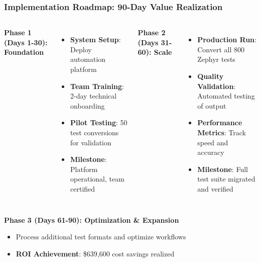 \begin{frame}
\frametitle{Implementation Roadmap: 90-Day Value Realization}
\begin{columns}
\textbf{Phase 1 (Days 1-30): Foundation}
\begin{itemize}
    \item \textbf{System Setup}: Deploy automation platform
    \item \textbf{Team Training}: 2-day technical onboarding
    \item \textbf{Pilot Testing}: 50 test conversions for validation
    \item \textbf{Milestone}: Platform operational, team certified
\end{itemize}

\textbf{Phase 2 (Days 31-60): Scale}
\begin{itemize}
    \item \textbf{Production Run}: Convert all 800 Zephyr tests
    \item \textbf{Quality Validation}: Automated testing of output
    \item \textbf{Performance Metrics}: Track speed and accuracy
    \item \textbf{Milestone}: Full test suite migrated and verified
\end{itemize}
\end{columns}

\vspace{0.3cm}
\textbf{Phase 3 (Days 61-90): Optimization \& Expansion}
\begin{itemize}
    \item Process additional test formats and optimize workflows
    \item \textbf{ROI Achievement}: \$639,600 cost savings realized
\end{itemize}
\end{frame}

